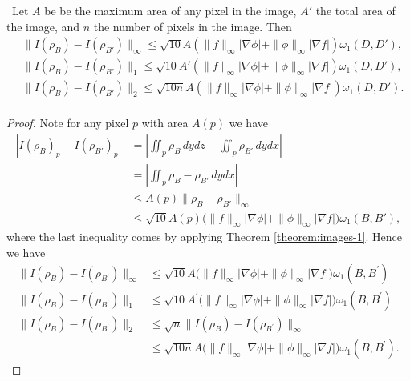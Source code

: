 \begin{theorem} \
    Let $ A $ be be the maximum area of any pixel in the image, $ A' $ the total area of the image, and $ n $ the number of pixels in the image. Then
    \begin{align}
        &\| I(\rho_B) - I(\rho_{B'}) \|_\infty \leq \sqrt{10} A (\|f\|_\infty |\nabla \phi | + \|\phi\|_\infty |\nabla f |) \omega_1(D, D'), \\
        &\| I(\rho_B) - I(\rho_{B'}) \|_1 \leq \sqrt{10} A' (\|f\|_\infty |\nabla \phi | + \|\phi\|_\infty |\nabla f |) \omega_1(D, D'), \\
        &\| I(\rho_B) - I(\rho_{B'}) \|_2 \leq \sqrt{10n} A (\|f\|_\infty |\nabla \phi | + \|\phi\|_\infty |\nabla f |) \omega_1(D, D'). \\
    \end{align}
\end{theorem}
\begin{proof}
    Note for any pixel $ p $ with area $ A(p) $ we have
    \begin{align}
        |I(\rho_{B})_{p} - I(\rho_{B'})_{p}| &= \left| \iint_{p} \rho_{B} \, dy dz - \iint_{p} \rho_{B'} \, dy dx \right| \\
        &= \left| \iint_{p} \rho_{B} - \rho_{B'} \, dy dx \right| \\
        &\leq A(p) \|\rho_{B} - \rho_{B'}\|_{\infty} \\
        &\leq \sqrt{10} A(p) \big( \|f\|_{\infty} |\nabla \phi| + \|\phi\|_{\infty} |\nabla f| \big) \omega_{1}(B, B'),
    \end{align}
    where the last inequality comes by applying Theorem \ref{theorem:images-1}. Hence we have
    \begin{align}
        \|I(\rho_{B}) - I(\rho_{B^{\prime}})\|_{\infty} &\leq \sqrt{10}A(\|f\|_{\infty}|\nabla\phi| + \|\phi\|_{\infty}|\nabla f|\big)\omega_{1}(B,B^{\prime}) \\
        \|I(\rho_{B}) - I(\rho_{B^{\prime}})\|_{1} &\leq \sqrt{10}A^{\prime}\big(\|f\|_{\infty}|\nabla\phi| + \|\phi\|_{\infty}|\nabla f|\big)\omega_{1}(B,B^{\prime}) \\
        \|I(\rho_{B}) - I(\rho_{B^{\prime}})\|_{2} &\leq \sqrt{n}\|I(\rho_{B}) - I(\rho_{B^{\prime}})\|_{\infty} \\
        &\leq \sqrt{10n}A\big(\|f\|_{\infty}|\nabla\phi| + \|\phi\|_{\infty}|\nabla f|\big)\omega_{1}(B,B^{\prime}).
    \end{align}
\end{proof}


